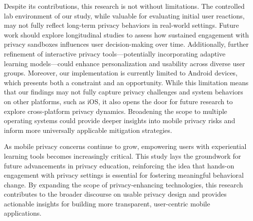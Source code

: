 \documentclass[acmlarge, nonacm]{acmart}
\begin{document}
Despite its contributions, this research is not without limitations. The controlled lab environment of our study, while valuable for evaluating initial user reactions, may not fully reflect long-term privacy behaviors in real-world settings. Future work should explore longitudinal studies to assess how sustained engagement with privacy sandboxes influences user decision-making over time. Additionally, further refinement of interactive privacy tools—potentially incorporating adaptive learning models—could enhance personalization and usability across diverse user groups. Moreover, our implementation is currently limited to Android devices, which presents both a constraint and an opportunity. While this limitation means that our findings may not fully capture privacy challenges and system behaviors on other platforms, such as iOS, it also opens the door for future research to explore cross-platform privacy dynamics. Broadening the scope to multiple operating systems could provide deeper insights into mobile privacy risks and inform more universally applicable mitigation strategies.

As mobile privacy concerns continue to grow, empowering users with experiential learning tools becomes increasingly critical. This study lays the groundwork for future advancements in privacy education, reinforcing the idea that hands-on engagement with privacy settings is essential for fostering meaningful behavioral change. By expanding the scope of privacy-enhancing technologies, this research contributes to the broader discourse on usable privacy design and provides actionable insights for building more transparent, user-centric mobile applications.




\end{document}
